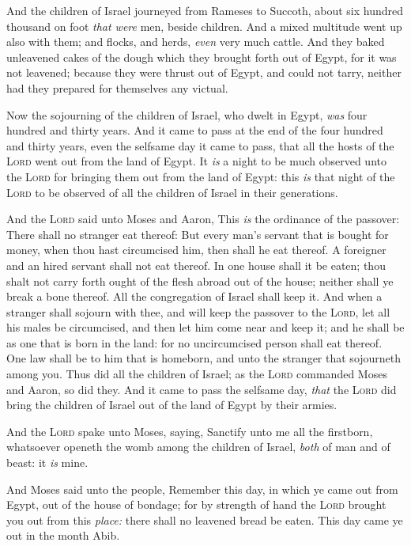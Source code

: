 \documentclass[11pt,letterpaper,oneside]{memoir}
\begin{document}
And the children of Israel journeyed from Rameses to Succoth, about six
hundred thousand on foot \emph{that were} men, beside children. And a
mixed multitude went up also with them; and flocks, and herds,
\emph{even} very much cattle. And they baked unleavened cakes of the
dough which they brought forth out of Egypt, for it was not leavened;
because they were thrust out of Egypt, and could not tarry, neither had
they prepared for themselves any victual.

Now the sojourning of the children of Israel, who dwelt in Egypt,
\emph{was} four hundred and thirty years. And it came to pass at the end
of the four hundred and thirty years, even the selfsame day it came to
pass, that all the hosts of the \textsc{Lord} went out from the land of
Egypt. It \emph{is} a night to be much observed unto the \textsc{Lord}
for bringing them out from the land of Egypt: this \emph{is} that night
of the \textsc{Lord} to be observed of all the children of Israel in
their generations.

And the \textsc{Lord} said unto Moses and Aaron, This \emph{is} the
ordinance of the passover: There shall no stranger eat thereof: But
every man's servant that is bought for money, when thou hast circumcised
him, then shall he eat thereof. A foreigner and an hired servant shall
not eat thereof. In one house shall it be eaten; thou shalt not carry
forth ought of the flesh abroad out of the house; neither shall ye break
a bone thereof. All the congregation of Israel shall keep it. And when a
stranger shall sojourn with thee, and will keep the passover to the
\textsc{Lord}, let all his males be circumcised, and then let him come
near and keep it; and he shall be as one that is born in the land: for
no uncircumcised person shall eat thereof. One law shall be to him that
is homeborn, and unto the stranger that sojourneth among you. Thus did
all the children of Israel; as the \textsc{Lord} commanded Moses and
Aaron, so did they. And it came to pass the selfsame day, \emph{that}
the \textsc{Lord} did bring the children of Israel out of the land of
Egypt by their armies.

And the \textsc{Lord} spake unto Moses, saying, Sanctify unto me all the
firstborn, whatsoever openeth the womb among the children of Israel,
\emph{both} of man and of beast: it \emph{is} mine.

And Moses said unto the people, Remember this day, in which ye came out
from Egypt, out of the house of bondage; for by strength of hand the
\textsc{Lord} brought you out from this \emph{place:} there shall no
leavened bread be eaten. This day came ye out in the month Abib.
\end{document}
